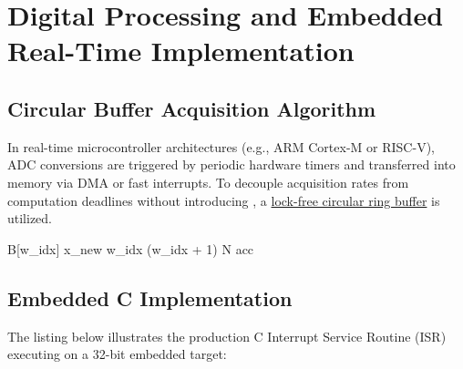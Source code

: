 \documentclass[
  lang=english,
  accent=0055A4,      %
  circuits=true,      %
  qed=smiley          %
]{opalith}
\begin{document}
\chapter{Digital Processing and Embedded Real-Time Implementation}

\section{Circular Buffer Acquisition Algorithm}
\label{sec:circular_buffer}

In real-time microcontroller architectures (e.g., ARM Cortex-M or RISC-V), ADC conversions are triggered by periodic hardware timers and transferred into memory via DMA or fast interrupts. To decouple acquisition rates from computation deadlines without introducing , a \uline{lock-free circular ring buffer} is utilized.

\begin{algorithm}[H]
\caption{Real-time causal FIR filtering on a circular ring buffer.}
\label{algo:fir_buffer}
\BlankLine
B[w_idx] \gets x_new\;
w_idx \gets (w_idx + 1) \bmod N\;
acc \;
\;
\end{algorithm}

\section{Embedded C Implementation}
\label{sec:c_code}

The listing below illustrates the production C Interrupt Service Routine (ISR) executing on a 32-bit embedded target:
\end{document}
